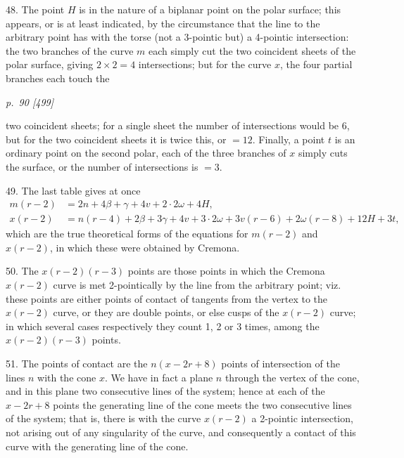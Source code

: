 \documentclass[11pt,a4paper]{article}
\newcommand{\pagemarker}[2]{\clearpage\noindent\textit{p.~#1 [#2]}\par\medskip}
\begin{document}
48. The point \(H\) is in the nature of a biplanar point on the polar surface; this
appears, or is at least indicated, by the circumstance that the line to the arbitrary
point has with the torse (not a 3-pointic but) a 4-pointic intersection: the two
branches of the curve \(m\) each simply cut the two coincident sheets of the polar
surface, giving \(2\times2=4\) intersections; but for the curve \(x\), the four partial
branches each touch the

\pagemarker{90}{499}
two coincident sheets; for a single sheet the number of intersections would be 6, but for the two coincident
sheets it is twice this, or \(=12\). Finally, a point \(t\) is an ordinary point on the
second polar, each of the three branches of \(x\) simply cuts the surface, or the number
of intersections is \(=3\).

49. The last table gives at once
\[
\begin{aligned}
m(r-2)&=2n+4\beta+\gamma+4v+2\cdot2\omega+4H,\\
x(r-2)&=n(r-4)+2\beta+3\gamma+4v+3\cdot2\omega
+3v(r-6)+2\omega(r-8)+12H+3t,
\end{aligned}
\]
which are the true theoretical forms of the equations for \(m(r-2)\) and \(x(r-2)\),
in which these were obtained by Cremona.

50. The \(x(r-2)(r-3)\) points are those points in which the Cremona \(x(r-2)\)
curve is met 2-pointically by the line from the arbitrary point; viz. these points
are either points of contact of tangents from the vertex to the \(x(r-2)\) curve, or
they are double points, or else cusps of the \(x(r-2)\) curve; in which several cases
respectively they count 1, 2 or 3 times, among the \(x(r-2)(r-3)\) points.

51. The points of contact are the \(n(x-2r+8)\) points of intersection of the lines
\(n\) with the cone \(x\). We have in fact a plane \(n\) through the vertex of the
cone, and in this plane two consecutive lines of the system; hence at each of the
\(x-2r+8\) points the generating line of the cone meets the two consecutive lines of
the system; that is, there is with the curve \(x(r-2)\) a 2-pointic intersection, not
arising out of any singularity of the curve, and consequently a contact of this curve
with the generating line of the cone.
\end{document}
